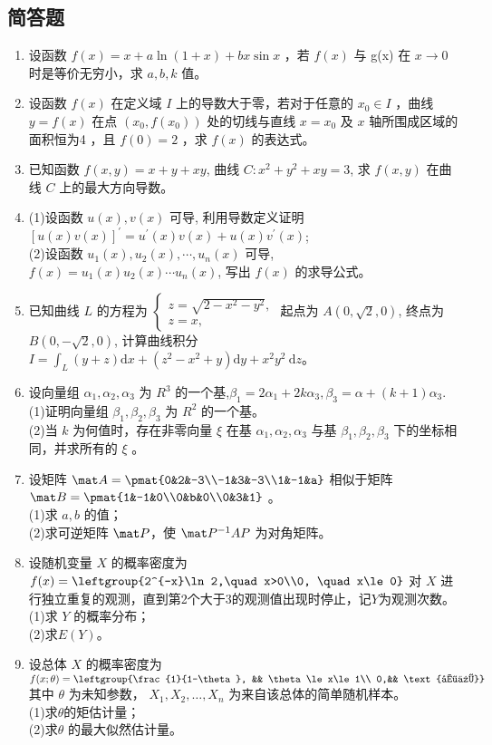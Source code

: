 \subsection{简答题}
\begin{enumerate}
\item 设函数 $f(x)=x+a\ln(1+x)+bx\sin x$ ，若 $f(x)$ 与 g(x) 在 $x \to 0$ 时是等价无穷小，求 $a,b,k$ 值。
\item  设函数 $f(x)$ 在定义域 $I$ 上的导数大于零，若对于任意的 $x_0 \in I$ ，曲线 $y=f(x)$ 在点 $(x_0,f(x_0))$ 处的切线与直线 $x=x_0$ 及 $x$ 轴所围成区域的面积恒为4 ，且 $f(0)=2$ ，求 $f(x)$ 的表达式。
\item  已知函数 $f(x, y)=x+y+x y$, 曲线 $C: x^2+y^2+x y=3$, 求 $f(x, y)$ 在曲线 $C$ 上的最大方向导数。
\item (1)设函数 $u(x), v(x)$ 可导, 利用导数定义证明 $[u(x) v(x)]^{\prime}=u^{\prime}(x) v(x)+u(x) v^{\prime}(x)$;\\
(2)设函数 $u_1(x), u_2(x), \cdots, u_n(x)$ 可导, $f(x)=u_1(x) u_2(x) \cdots u_n(x)$, 写出 $f(x)$ 的求导公式。
\item 已知曲线 $L$ 的方程为 $\left\{\begin{array}{l}z=\sqrt{2-x^2-y^2}, \\ z=x,\end{array}\right.$ 起点为 $A(0, \sqrt{2}, 0)$, 终点为 $B(0,-\sqrt{2}, 0)$, 计算曲线积分 $I=\int_L(y+z) \mathrm{d} x+\left(z^2-x^2+y\right) \mathrm{d} y+x^2 y^2 \mathrm{~d} z$。
\item  设向量组 $\alpha_1,\alpha_2,\alpha_3$ 为 $R^3$ 的一个基,$\beta_1=2\alpha_1+2k\alpha_3,\beta_3=\alpha+(k+1)\alpha_3$.\\
(1)证明向量组  $\beta_1,\beta_2,\beta_3$ 为 $R^2$ 的一个基。\\
(2)当 $k$ 为何值时，存在非零向量 $\xi$ 在基  $\alpha_1,\alpha_2,\alpha_3$ 与基  $\beta_1,\beta_2,\beta_3$ 下的坐标相同，并求所有的 $\xi$ 。
\item 设矩阵 $\mat A=\pmat{0&2&-3\\-1&3&-3\\1&-1&a}$ 相似于矩阵 $\mat B=\pmat{1&-1&0\\0&b&0\\0&3&1}$ 。\\
(1)求 $a,b$ 的值；\\
(2)求可逆矩阵 $\mat P$，使 $\mat P^{-1}AP$  为对角矩阵。
\item 设随机变量 $X$ 的概率密度为 $f(x)=\leftgroup{2^{-x}\ln 2,\quad x>0\\0, \quad  x\le 0}$ 对 $X$ 进行独立重复的观测，直到第2个大于3的观测值出现时停止，记$Y$为观测次数。\\
(1)求 $Y$ 的概率分布；\\
(2)求$E(Y)$。
\item 设总体 $X$ 的概率密度为 $f(x;\theta)=\leftgroup{\frac{1}{1-\theta}, && \theta \le x\le 1\\ 0,&& \text{其他}}$其中 $\theta$ 为未知参数， $X_1,X_2,\dots ,X_n$  为来自该总体的简单随机样本。\\
(1)求$ \theta $的矩估计量；\\
(2)求$ \theta$ 的最大似然估计量。
\end{enumerate}
